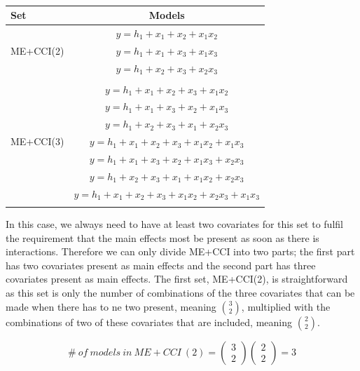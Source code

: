 \begin{table}
\centering
\caption{}
\begin{tabular}{lc} 
\toprule
Set & Models \\ 
\midrule
\multirow{3}{*}{ME+CCI(2)} & $y=h_1+x_1+x_2+x_1x_2$\\ & $y=h_1+x_1+x_3+x_1x_3$\\ & $y=h_1+x_2+x_3+x_2x_3$\\ &  \\  
\multirow{7}{*}{ME+CCI(3)} & $y=h_1+x_1+x_2+x_3+x_1x_2$\\ & $y=h_1+x_1+x_3+x_2+x_1x_3$\\ & $y=h_1+x_2+x_3+x_1+x_2x_3$\\ & $y=h_1+x_1+x_2+x_3+x_1x_2+x_1x_3$\\ & $y=h_1+x_1+x_3+x_2+x_1x_3+x_2x_3$\\ & $y=h_1+x_2+x_3+x_1+x_1x_2+x_2x_3$\\ & $y=h_1+x_1+x_2+x_3+x_1x_2+x_2x_3+x_1x_3$\\ & \\ 
\bottomrule
\end{tabular}
\end{table}

In this case, we always need to have at least two covariates for this set to fulfil the requirement that the main effects most be present as soon as there is interactions. Therefore we can only divide ME+CCI into two parts; the first part has two covariates present as main effects and the second part has three covariates present as main effects. The first set, ME+CCI(2), is straightforward as this set is only the number of combinations of the three covariates that can be made when there has to ne two present, meaning $\binom{3}{2}$, multiplied with the combinations of two of these covariates that are included, meaning $\binom{2}{2}$.

\noindent 
\[\#\ of\ models\ in\ ME+CCI\ \left(2\right)=\left( \begin{array}{c}
3 \\ 
2 \end{array}
\right)\left( \begin{array}{c}
2 \\ 
2 \end{array}
\right)=3\] 

